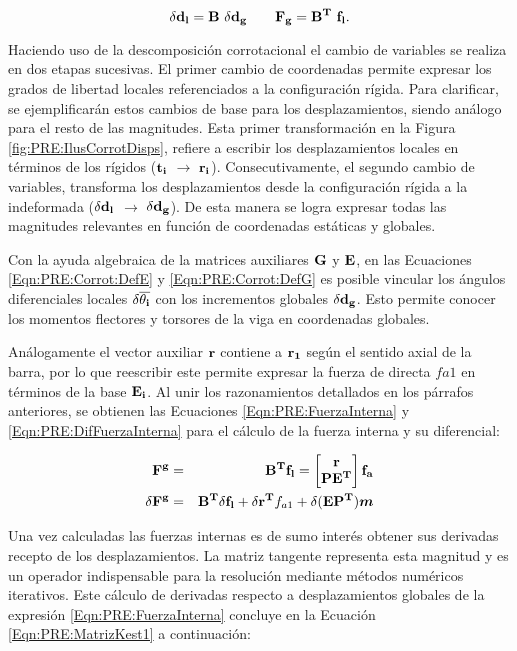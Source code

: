 \begin{equation}\label{Eqn:PRE:CambioCoord}
	\bf{\delta d_l}=\bf{B}~\bf{\delta d_g} ~~~~~~ \bf{ F_g}=\bf{B}^T~\bf{ f_l}.
\end{equation}


Haciendo uso de la descomposición corrotacional el cambio de variables se realiza en dos etapas sucesivas. El primer cambio de coordenadas permite expresar los grados de libertad locales referenciados a la configuración rígida. Para clarificar, se ejemplificarán estos cambios de base para los desplazamientos, siendo análogo para el resto de las magnitudes. Esta primer transformación en la Figura \ref{fig:PRE:IlusCorrotDisps}, refiere a escribir los desplazamientos locales en términos de los rígidos ($\bf{t_i}$ $\rightarrow$ $\bf{r_i}$). Consecutivamente, el segundo cambio de variables, transforma los desplazamientos desde la configuración rígida a la indeformada ($\delta \bf{d_l}$ $\rightarrow$ $\delta \bf{d_g}$). De esta manera se logra expresar todas las magnitudes relevantes en función de coordenadas estáticas y globales. 

Con la ayuda algebraica de la matrices auxiliares $\bf{G}$ y $\bf{E}$, en las Ecuaciones \eqref{Eqn:PRE:Corrot:DefE} y \eqref{Eqn:PRE:Corrot:DefG} es posible vincular los ángulos diferenciales locales $\delta\bf{\overline{\theta_i}}$ con los incrementos globales $\delta \bf{d_g}$. Esto permite conocer los momentos flectores y torsores de la viga en coordenadas globales.

Análogamente el vector auxiliar $\bf{r}$ contiene a $\bf{r}_1$ según el sentido axial de la barra, por lo que reescribir este permite expresar la fuerza de directa $fa1$  en términos de la base $\bf{E_i}$. Al unir los razonamientos detallados en los párrafos anteriores, se obtienen las Ecuaciones \eqref{Eqn:PRE:FuerzaInterna} y \eqref{Eqn:PRE:DifFuerzaInterna} para el cálculo de la fuerza interna y su diferencial:

\begin{eqnarray}\label{Eqn:PRE:FuerzaInterna}
	\bf{F^g}&=&\bf{B}^T\bf{f_l}= \begin{bmatrix}
		\bf{r}\\ 
		\bf{PE^T}
	\end{bmatrix}\bf{f_a}\\
    \label{Eqn:PRE:DifFuerzaInterna} 
	\delta\bf{F^g}&=&\bf{B}^T\delta\bf{f_l}+\delta\bf{r}^T \text{$f_{a1}$}+\delta(\bf{EP^T}) \boldsymbol{m} 
\end{eqnarray} 

Una vez calculadas las fuerzas internas es de sumo interés obtener sus derivadas recepto de los desplazamientos. La matriz tangente representa esta magnitud y es un operador indispensable para la resolución mediante métodos numéricos iterativos. Este cálculo de derivadas respecto a desplazamientos globales de la expresión \eqref{Eqn:PRE:FuerzaInterna} concluye en la Ecuación \eqref{Eqn:PRE:MatrizKest1} a continuación: 

